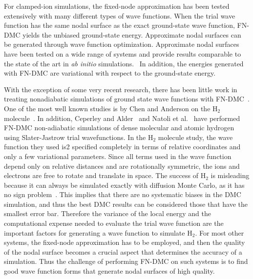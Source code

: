 \documentclass[aip,jcp,numerical,reprint]{revtex4-1}
\begin{document}
For clamped-ion simulations, the fixed-node approximation has been tested extensively with many different types of wave functions.  When the trial wave function has the same nodal surface as the exact ground-state wave function, FN-DMC yields the unbiased ground-state energy.  Approximate nodal surfaces can be generated through wave function optimization.  Approximate nodal surfaces have been tested on a wide range of systems and provide results comparable to the state of the art in \textit{ab initio} simulations.~\cite{Stuart_Review,rothstein1,grossman1,Yang2015,Tubman_Release} In addition, the energies generated with FN-DMC are variational with respect to the ground-state energy.


With the exception of some very recent research, there has been little work in treating nonadiabatic simulations of ground state wave functions with FN-DMC~\cite{Tubman_ECG,Yang2015}. One of the most well known studies is by Chen and Anderson   on  the H$_{2}$ molecule~\cite{chen1995}. In addition, Ceperley and Alder~\cite{Ceperley_1987} and Natoli et al.~\cite{Natoli_1993,Natoli_1995}  have performed FN-DMC non-adiabatic simulations of dense molecular and atomic hydrogen using Slater-Jastrow trial wavefunctions. In the H$_2$ molecule study, the wave function they used is2 specified completely in terms of relative coordinates and only a few variational parameters. Since all terms used in the wave function depend only on relative distances and are rotationally symmetric, the ions and electrons are free to rotate and translate in space. 
The success of H$_{2}$ is misleading because it can always be simulated exactly with diffusion Monte Carlo, as it has no sign problem~\cite{Tubman_Release}.  This implies that there are no systematic biases in the DMC simulation, and thus the best DMC results can be considered those that have the smallest error bar.  Therefore the variance of the local energy and the computational expense needed to evaluate the trial wave function are the important factors for generating a wave function to simulate H$_{2}$.  For most other systems, the fixed-node approximation has to be employed, and then the quality of the nodal surface becomes a crucial aspect that determines the accuracy of a simulation.  Thus the challenge of performing FN-DMC on such systems is to find good wave function forms that generate nodal surfaces of high quality.
\end{document}
